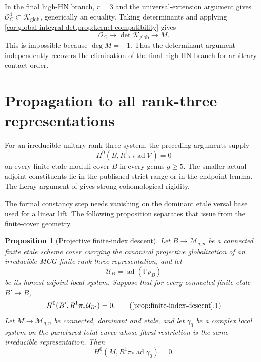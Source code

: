 \documentclass[11pt]{article}
\newtheorem{proposition}[theorem]{Proposition}
\theoremstyle{definition}
\newcommand{\Ocal}{\mathcal O}
\newcommand{\Mcal}{\mathcal M}
\newcommand{\Vcal}{\mathcal V}
\newcommand{\Ucal}{\mathcal U}
\newcommand{\Kcal}{\mathcal K}
\newcommand{\ad}{\operatorname{ad}}
\begin{document}
In the final high-HN branch, $r=3$ and the universal-extension argument gives
$\Ocal_C^4\subset\Kcal_{\mathrm{glob}}$, generically an equality.  Taking
determinants and applying
\cref{cor:global-integral-det,prop:kernel-compatibility}
gives
\[
 \Ocal_C\longrightarrow\det\Kcal_{\mathrm{glob}}
 \longrightarrow M.
\]
This is impossible because $\deg M=-1$.  Thus the determinant argument
independently recovers the elimination of the final high-HN branch for
arbitrary contact order.

\section{Propagation to all rank-three representations}\label{sec:propagation}

For an irreducible unitary rank-three system, the preceding arguments supply
\[
 H^0(B,R^1\pi_*\ad\Vcal)=0
\]
on every finite etale moduli cover $B$ in every genus $g\ge5$.  The smaller
actual adjoint constituents lie in the published strict range or in the
endpoint lemma.  The Leray argument of
\cite[Proposition 8.2.1]{LLCan} gives strong cohomological rigidity.

The formal constancy step needs vanishing on the dominant etale versal base
used for a linear lift.  The following proposition separates that issue from
the finite-cover geometry.

\begin{proposition}[Projective finite-index descent]
\label{prop:finite-index-descent}
Let $B\to\Mcal_{g,n}$ be a connected finite etale scheme cover carrying the
canonical projective globalization of an irreducible MCG-finite
rank-three representation, and let
\[
 \Ucal_B=\ad(\mathbb P\rho_B)
\]
be its honest adjoint local system.  Suppose that for every connected finite
etale $B'\to B$,
\[
 H^0(B',R^1\pi_*\Ucal_{B'})=0.
 \tag{\ref{prop:finite-index-descent}.1}
\]
Let $M\to\Mcal_{g,n}$ be connected, dominant and etale, and let $\gamma_0$
be a complex local system on the punctured total curve whose fibral
restriction is the same irreducible representation.  Then
\[
 H^0(M,R^1\pi_*\ad\gamma_0)=0.
\]
\end{proposition}
\end{document}
